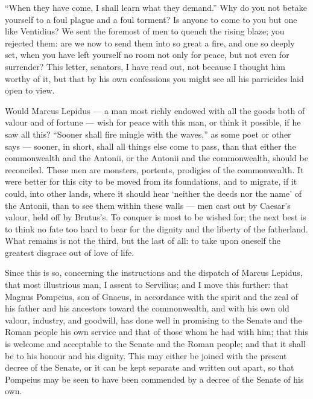  ``When they have come, I shall learn what they demand.'' Why do you not betake yourself to a foul plague and a foul torment? Is anyone to come to you but one like Ventidius? We sent the foremost of men to quench the rising blaze; you rejected them: are we now to send them into so great a fire, and one so deeply set, when you have left yourself no room not only for peace, but not even for surrender? This letter, senators, I have read out, not because I thought him worthy of it, but that by his own confessions you might see all his parricides laid open to view.

 Would Marcus Lepidus --- a man most richly endowed with all the goods both of valour and of fortune --- wish for peace with this man, or think it possible, if he saw all this? ``Sooner shall fire mingle with the waves,'' as some poet or other says --- sooner, in short, shall all things else come to pass, than that either the commonwealth and the Antonii, or the Antonii and the commonwealth, should be reconciled. These men are monsters, portents, prodigies of the commonwealth. It were better for this city to be moved from its foundations, and to migrate, if it could, into other lands, where it should hear `neither the deeds nor the name' of the Antonii, than to see them within these walls --- men cast out by Caesar's valour, held off by Brutus's. To conquer is most to be wished for; the next best is to think no fate too hard to bear for the dignity and the liberty of the fatherland. What remains is not the third, but the last of all: to take upon oneself the greatest disgrace out of love of life.

 Since this is so, concerning the instructions and the dispatch of Marcus Lepidus, that most illustrious man, I assent to Servilius; and I move this further: that Magnus Pompeius, son of Gnaeus, in accordance with the spirit and the zeal of his father and his ancestors toward the commonwealth, and with his own old valour, industry, and goodwill, has done well in promising to the Senate and the Roman people his own service and that of those whom he had with him; that this is welcome and acceptable to the Senate and the Roman people; and that it shall be to his honour and his dignity. This may either be joined with the present decree of the Senate, or it can be kept separate and written out apart, so that Pompeius may be seen to have been commended by a decree of the Senate of his own.

